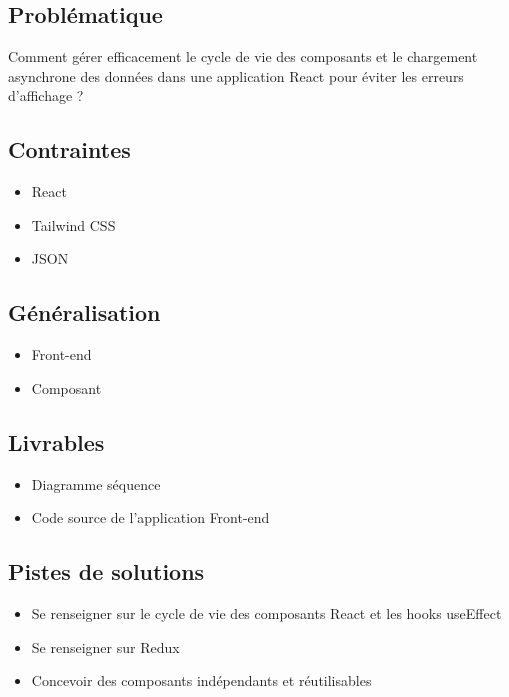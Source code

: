 \subsection*{Problématique}
{}
\noindent Comment gérer efficacement le cycle de vie des composants et le chargement asynchrone des données dans une application React pour éviter les erreurs d'affichage ?

\subsection*{Contraintes}
{}
\begin{itemize}
	\item React
	\item Tailwind CSS
	\item JSON
\end{itemize}

\subsection*{Généralisation}
{}
\begin{itemize}
	\item Front-end
	\item Composant
\end{itemize}

\subsection*{Livrables}
{}
\begin{itemize}
	\item Diagramme séquence
	\item Code source de l'application Front-end
\end{itemize}

\newpage

\subsection*{Pistes de solutions}
{}
\begin{itemize}
	\item Se renseigner sur le cycle de vie des composants React et les hooks useEffect
	\item Se renseigner sur Redux
	\item Concevoir des composants indépendants et réutilisables
\end{itemize}

